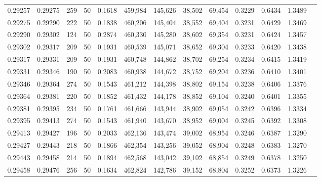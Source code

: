 \begin{tabular}{rrrrrrrrrrrrr}
0.29257 & 0.29275 &   259 &  50 &                                     0.1618 & 459,984 & 145,626 &  38,502 &  69,454 & 0.3229 & 0.6434 & 1.3489 \\
0.29275 & 0.29290 &   222 &  50 &                                     0.1838 & 460,206 & 145,404 &  38,552 &  69,404 & 0.3231 & 0.6429 & 1.3469 \\
0.29290 & 0.29302 &   124 &  50 &                                     0.2874 & 460,330 & 145,280 &  38,602 &  69,354 & 0.3231 & 0.6424 & 1.3457 \\
0.29302 & 0.29317 &   209 &  50 &                                     0.1931 & 460,539 & 145,071 &  38,652 &  69,304 & 0.3233 & 0.6420 & 1.3438 \\
0.29317 & 0.29331 &   209 &  50 &                                     0.1931 & 460,748 & 144,862 &  38,702 &  69,254 & 0.3234 & 0.6415 & 1.3419 \\
0.29331 & 0.29346 &   190 &  50 &                                     0.2083 & 460,938 & 144,672 &  38,752 &  69,204 & 0.3236 & 0.6410 & 1.3401 \\
0.29346 & 0.29364 &   274 &  50 &                                     0.1543 & 461,212 & 144,398 &  38,802 &  69,154 & 0.3238 & 0.6406 & 1.3376 \\
0.29364 & 0.29381 &   220 &  50 &                                     0.1852 & 461,432 & 144,178 &  38,852 &  69,104 & 0.3240 & 0.6401 & 1.3355 \\
0.29381 & 0.29395 &   234 &  50 &                                     0.1761 & 461,666 & 143,944 &  38,902 &  69,054 & 0.3242 & 0.6396 & 1.3334 \\
0.29395 & 0.29413 &   274 &  50 &                                     0.1543 & 461,940 & 143,670 &  38,952 &  69,004 & 0.3245 & 0.6392 & 1.3308 \\
0.29413 & 0.29427 &   196 &  50 &                                     0.2033 & 462,136 & 143,474 &  39,002 &  68,954 & 0.3246 & 0.6387 & 1.3290 \\
0.29427 & 0.29443 &   218 &  50 &                                     0.1866 & 462,354 & 143,256 &  39,052 &  68,904 & 0.3248 & 0.6383 & 1.3270 \\
0.29443 & 0.29458 &   214 &  50 &                                     0.1894 & 462,568 & 143,042 &  39,102 &  68,854 & 0.3249 & 0.6378 & 1.3250 \\
0.29458 & 0.29476 &   256 &  50 &                                     0.1634 & 462,824 & 142,786 &  39,152 &  68,804 & 0.3252 & 0.6373 & 1.3226 \\

\end{tabular}
